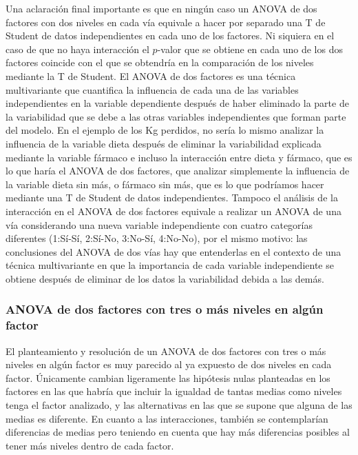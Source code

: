 Una aclaración final importante es que en ningún caso un ANOVA de dos factores con dos niveles en cada vía equivale a
hacer por separado una T de Student de datos independientes en cada uno de los factores. Ni siquiera en el caso de que
no haya interacción el $p$-valor que se obtiene en cada uno de los dos factores coincide con el que se obtendría en la
comparación de los niveles mediante la T de Student. El ANOVA de dos factores es una técnica multivariante que
cuantifica la influencia de cada una de las variables independientes en la variable dependiente después de haber
eliminado la parte de la variabilidad que se debe a las otras variables independientes que forman parte del modelo. En
el ejemplo de los Kg perdidos, no sería lo mismo analizar la influencia de la variable dieta después de eliminar la
variabilidad explicada mediante la variable fármaco e incluso la interacción entre dieta y fármaco, que es lo que haría
el ANOVA de dos factores, que analizar simplemente la influencia de la variable dieta sin más, o fármaco sin más, que es
lo que podríamos hacer mediante una T de Student de datos independientes. Tampoco el análisis de la interacción en el
ANOVA de dos factores equivale a realizar un ANOVA de una vía considerando una nueva variable independiente con cuatro
categorías diferentes (1:Sí-Sí, 2:Sí-No, 3:No-Sí, 4:No-No), por el mismo motivo:
las conclusiones del ANOVA de dos vías hay que entenderlas en el contexto de una técnica multivariante en que la
importancia de cada variable independiente se obtiene después de eliminar de los datos la variabilidad debida a las
demás.


\subsubsection{ANOVA de dos factores con tres o más niveles en algún factor}
El planteamiento y resolución de un ANOVA de dos factores con tres o más niveles en algún factor es muy parecido al ya
expuesto de dos niveles en cada factor. Únicamente cambian ligeramente las hipótesis nulas planteadas en los factores en
las que habría que incluir la igualdad de tantas medias como niveles tenga el factor analizado, y las alternativas en
las que se supone que alguna de las medias es diferente. En cuanto a las interacciones, también se contemplarían
diferencias de medias pero teniendo en cuenta que hay más diferencias posibles al tener más niveles dentro de cada
factor.

